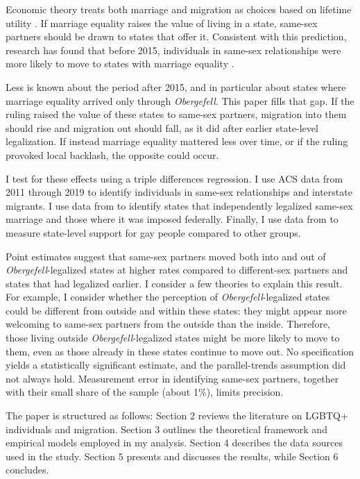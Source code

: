 \documentclass[12pt,letterpaper]{article}
\begin{document}
Economic theory treats both marriage and migration as choices based on lifetime utility \citep{8, 9, 12}. If marriage equality raises the value of living in a state, same-sex partners should be drawn to states that offer it. Consistent with this prediction, research has found that before 2015, individuals in same-sex relationships were more likely to move to states with marriage equality \citep{1, 12}. 

Less is known about the period after 2015, and in particular about states where marriage equality arrived only through \textit{Obergefell}. This paper fills that gap. If the ruling raised the value of these states to same-sex partners, migration into them should rise and migration out should fall, as it did after earlier state-level legalization. If instead marriage equality mattered less over time, or if the ruling provoked local backlash, the opposite could occur. 

I test for these effects using a triple differences regression. I use ACS data from 2011 through 2019 to identify individuals in same-sex relationships and interstate migrants. I use data from \citet{27} to identify states that independently legalized same-sex marriage and those where it was imposed federally. Finally, I use data from \citet{29} to measure state-level support for gay people compared to other groups.

Point estimates suggest that same-sex partners moved both into and out of \textit{Obergefell}-legalized states at higher rates compared to different-sex partners and states that had legalized earlier. I consider a few theories to explain this result. For example, I consider whether the perception of \textit{Obergefell}-legalized states could be different from outside and within these states: they might appear more welcoming to same-sex partners from the outside than the inside. Therefore, those living outside \textit{Obergefell}-legalized states might be more likely to move to them, even as those already in these states continue to move out. No specification yields a statistically significant estimate, and the parallel-trends assumption did not always hold. Measurement error in identifying same-sex partners, together with their small share of the sample (about 1\%), limits precision.


The paper is structured as follows: Section 2 reviews the literature on LGBTQ+ individuals and migration. Section 3 outlines the theoretical framework and empirical models employed in my analysis. Section 4 describes the data sources used in the study. Section 5 presents and discusses the results, while Section 6 concludes.
\end{document}

